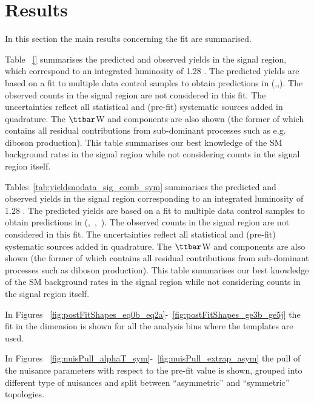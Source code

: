 \section{Results}
\label{sec:results}

In this section the main results concerning the fit are summarised. 

Table ~\ref{} summarises the predicted and observed yields in the signal region, which correspond to an integrated luminosity of 1.28 \ifb. 
The predicted yields are based on a fit to multiple data control samples to obtain predictions in (\nj,\nb,\scalht). 
The observed counts in the signal region are not considered in this fit. 
The uncertainties reflect all statistical and (pre-fit) systematic sources added in quadrature. 
The $\ttbar$W and \znunu components are also shown (the former of which contains all residual contributions from sub-dominant processes such as e.g. diboson production). 
This table summarises our best knowledge of the SM background rates in the signal region while not considering counts in the signal region itself. 

Tables~\ref{tab:yieldsnodata_sig_comb_sym} summarises the predicted and
observed yields in the signal region corresponding to an integrated
luminosity of 1.28 \ifb. The predicted yields are based on a fit to
multiple data control samples to obtain predictions in
(\njet,~\nb,~\scalht). The observed counts in the signal region are
not considered in this fit. The uncertainties reflect all statistical
and (pre-fit) systematic sources added in quadrature. The $\ttbar$W
and \znunu components are also shown (the former of which contains
all residual contributions from sub-dominant processes such as \eg
diboson production). This table summarises our best knowledge of the
SM background rates in the signal region while not considering counts
in the signal region itself.



In Figures ~\ref{fig:postFitShapes_eq0b_eq2a}-~\ref{fig:postFitShapes_ge3b_ge5j} the fit in the \MHT dimension is shown for all the analysis bins where the \MHT templates are used.

In Figures ~\ref{fig:nuisPull_alphaT_sym}-~\ref{fig:nuisPull_extrap_asym} the pull of the nuisance parameters with respect to the pre-fit value is shown, 
grouped into different type of nuisances and split between ``asymmetric'' and ``symmetric'' topologies.

